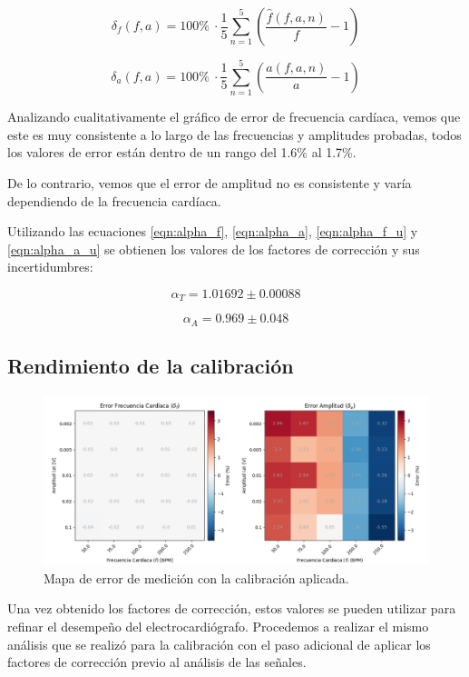 \documentclass[conference]{IEEEtran}
\begin{document}
$$ \delta_{f} \left(f, a\right) = 100 \% ~ \cdot \dfrac{1}{5} \sum_{n=1}^{5}
\left( \dfrac{\hat{f}(f,a,n)}{f} - 1\right)$$
 

$$ \delta_{a} \left(f, a\right) = 100 \% ~ \cdot \dfrac{1}{5} \sum_{n=1}^{5}
\left( \dfrac{\hat{a}(f,a,n)}{a} - 1\right)$$


Analizando cualitativamente el gráfico de error de frecuencia cardíaca, vemos
que este es muy consistente a lo largo de las frecuencias y amplitudes probadas,
todos los valores de error están dentro de un rango del 1.6\% al 1.7\%.

De lo contrario, vemos que el error de amplitud no es consistente y varía
dependiendo de la frecuencia cardíaca.

Utilizando las ecuaciones \ref{eqn:alpha_f}, \ref{eqn:alpha_a},
\ref{eqn:alpha_f_u} y \ref{eqn:alpha_a_u} se obtienen los valores de los
factores de corrección y sus incertidumbres:

\boldmath
$$ \alpha_{T} = 1.01692 \pm 0.00088 $$

$$ \alpha_{A} = 0.969 \pm 0.048 $$
\unboldmath  

\subsection{Rendimiento de la calibración}

\begin{figure}[t]
    \centering
    \includegraphics[width=\textwidth]{figs/test_error_map.png}
    \caption{Mapa de error de medición con la calibración aplicada.}
    \label{fig:plot_errpr_con_calib}

\end{figure}

Una vez obtenido los factores de corrección, estos valores se pueden utilizar
para refinar el desempeño del electrocardiógrafo. Procedemos a
realizar el mismo análisis que se realizó para la calibración con el paso
adicional de aplicar los factores de corrección previo al análisis de las
señales.
\end{document}
